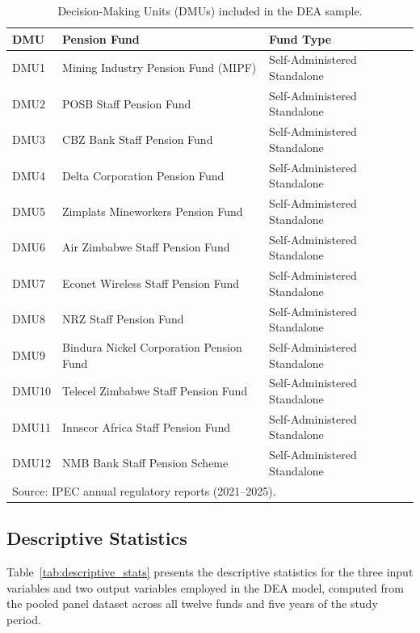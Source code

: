 \documentclass[12pt,a4paper]{article}
\begin{document}
\begin{table}[H]
\centering
\caption{Decision-Making Units (DMUs) included in the DEA sample.}
\label{tab:dmu_list}
\begin{tabular}{lll}
\toprule
\textbf{DMU} & \textbf{Pension Fund} & \textbf{Fund Type} \\
\midrule
DMU1  & Mining Industry Pension Fund (MIPF)        & Self-Administered Standalone \\
DMU2  & POSB Staff Pension Fund                     & Self-Administered Standalone \\
DMU3  & CBZ Bank Staff Pension Fund                 & Self-Administered Standalone \\
DMU4  & Delta Corporation Pension Fund              & Self-Administered Standalone \\
DMU5  & Zimplats Mineworkers Pension Fund           & Self-Administered Standalone \\
DMU6  & Air Zimbabwe Staff Pension Fund             & Self-Administered Standalone \\
DMU7  & Econet Wireless Staff Pension Fund          & Self-Administered Standalone \\
DMU8  & NRZ Staff Pension Fund                      & Self-Administered Standalone \\
DMU9  & Bindura Nickel Corporation Pension Fund     & Self-Administered Standalone \\
DMU10 & Telecel Zimbabwe Staff Pension Fund         & Self-Administered Standalone \\
DMU11 & Innscor Africa Staff Pension Fund           & Self-Administered Standalone \\
DMU12 & NMB Bank Staff Pension Scheme               & Self-Administered Standalone \\
\bottomrule
\multicolumn{3}{l}{\footnotesize Source: IPEC annual regulatory reports (2021--2025).}
\end{tabular}
\end{table}

\subsection{Descriptive Statistics}

Table~\ref{tab:descriptive_stats} presents the descriptive statistics for the three input variables and two output variables employed in the DEA model, computed from the pooled panel dataset across all twelve funds and five years of the study period.
\end{document}
